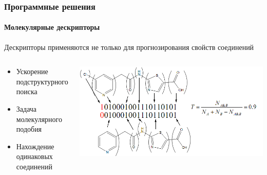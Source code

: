 \begin{frame}
   \frametitle{Программные решения}
   \framesubtitle{Молекулярные дескрипторы}
   Дескрипторы применяются не только для прогнозирования свойств соединений   
   \begin{columns}
     \begin{column}{0.4\textwidth}
       \begin{itemize}
         \item Ускорение подструктурного поиска
         \item Задача молекулярного подобия
         \item Нахождение одинаковых соединений
       \end{itemize}
     \end{column}
     \begin{column}{0.6\textwidth}
   \begin{center}
    \includegraphics[scale=0.4]{images/similarity.png}
   \end{center}
   \end{column}
   \end{columns}
\end{frame}

